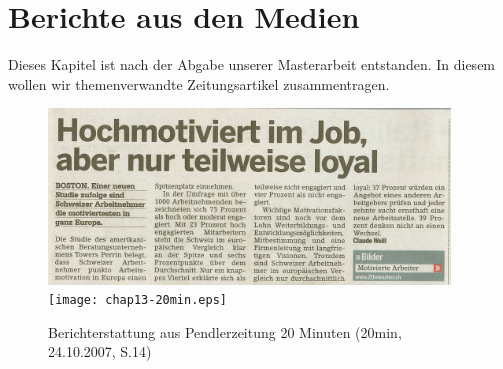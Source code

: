 \chapter{Berichte aus den Medien}

Dieses Kapitel ist nach der Abgabe unserer Masterarbeit entstanden. In diesem wollen wir themenverwandte Zeitungsartikel zusammentragen.

\begin{figure}[ht]
	\centering
		
	\ifpdf
		\includegraphics[width=0.95\textwidth]{chap13-20min.png}
	\else	
		\texttt{[image: chap13-20min.eps]}
	\fi
		
	\caption[Berichterstattung aus Pendlerzeitung 20 Minuten]{Berichterstattung aus Pendlerzeitung 20 Minuten (20min, 24.10.2007, S.14)}	
	\label{fig:20min}
\end{figure}